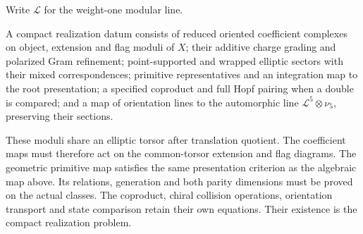 Write $\mathcal L$ for the weight-one modular line.

\begin{definition}
\label{comp:def:geometric-realization}
A compact realization datum consists of reduced oriented coefficient
complexes on object, extension and flag moduli of \(X\); their
additive charge grading and polarized Gram refinement; point-supported
and wrapped elliptic sectors with their mixed correspondences;
primitive representatives and an integration map to the root
presentation; a specified coproduct and full Hopf pairing when a
double is compared; and a map of orientation lines to the automorphic
line \(\mathcal L^5\otimes\nu_5\), preserving their sections.
\end{definition}

These moduli share an elliptic torsor after translation quotient.
The coefficient maps must therefore act on the common-torsor
extension and flag diagrams. The geometric primitive map satisfies
the same presentation criterion as the algebraic map above.
Its relations, generation and both parity dimensions must be proved
on the actual classes. The coproduct, chiral collision operations,
orientation transport and state comparison retain their own equations.
Their existence is the compact realization problem.

